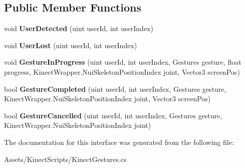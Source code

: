 \subsection*{Public Member Functions}
\begin{DoxyCompactItemize}
\item 
\mbox{\label{interface_kinect_gestures_1_1_gesture_listener_interface_a7d5f8a883f6ceceac7c66349eb2dd254}} 
void {\bfseries User\+Detected} (uint user\+Id, int user\+Index)
\item 
\mbox{\label{interface_kinect_gestures_1_1_gesture_listener_interface_a6efb826325af8b69ea7523e44d0d199e}} 
void {\bfseries User\+Lost} (uint user\+Id, int user\+Index)
\item 
\mbox{\label{interface_kinect_gestures_1_1_gesture_listener_interface_a9dde26ecbcbf4d8da10e36adc4005fc4}} 
void {\bfseries Gesture\+In\+Progress} (uint user\+Id, int user\+Index, Gestures gesture, float progress, Kinect\+Wrapper.\+Nui\+Skeleton\+Position\+Index joint, Vector3 screen\+Pos)
\item 
\mbox{\label{interface_kinect_gestures_1_1_gesture_listener_interface_a469fe8287f4b19f061568a0ec0425df9}} 
bool {\bfseries Gesture\+Completed} (uint user\+Id, int user\+Index, Gestures gesture, Kinect\+Wrapper.\+Nui\+Skeleton\+Position\+Index joint, Vector3 screen\+Pos)
\item 
\mbox{\label{interface_kinect_gestures_1_1_gesture_listener_interface_ab0cfad45796c5974c4bc3464689b0387}} 
bool {\bfseries Gesture\+Cancelled} (uint user\+Id, int user\+Index, Gestures gesture, Kinect\+Wrapper.\+Nui\+Skeleton\+Position\+Index joint)
\end{DoxyCompactItemize}


The documentation for this interface was generated from the following file\+:\begin{DoxyCompactItemize}
\item 
Assets/\+Kinect\+Scripts/Kinect\+Gestures.\+cs\end{DoxyCompactItemize}
